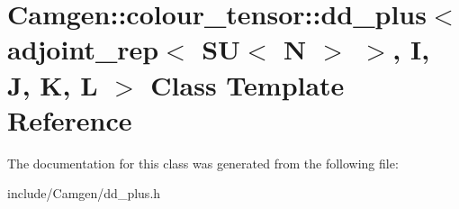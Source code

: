 \hypertarget{a00124}{\section{Camgen\-:\-:colour\-\_\-tensor\-:\-:dd\-\_\-plus$<$ adjoint\-\_\-rep$<$ S\-U$<$ N $>$ $>$, I, J, K, L $>$ Class Template Reference}
\label{a00124}
}


The documentation for this class was generated from the following file\-:\begin{DoxyCompactItemize}
\item 
include/\-Camgen/dd\-\_\-plus.\-h\end{DoxyCompactItemize}
